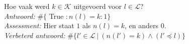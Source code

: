 
\item Hoe vaak werd $k \in \mathcal{K}$ uitgevoerd voor $l \in \mathcal{L}$? \\


\emph{Antwoord:}  $ \# \{$ True $: n(l) = k : 1 \}$ \\
\emph{Assessment:} Hier staat $1$ als $n(l)=k$, en anders $0$. \\

\emph{Verbeterd antwoord:} $\# \{ l' \in \mathcal{L} ~|~ (n(l') = k) \wedge (l' \preccurlyeq l) \}$ \\
